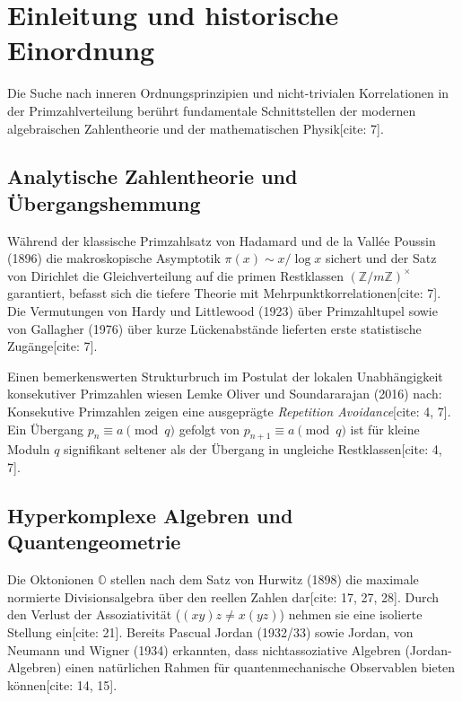 \documentclass[11pt,a4paper]{article}
\theoremstyle{definition}
\theoremstyle{remark}
\begin{document}
\section{Einleitung und historische Einordnung}

Die Suche nach inneren Ordnungsprinzipien und nicht-trivialen Korrelationen in der Primzahlverteilung berührt fundamentale Schnittstellen der modernen algebraischen Zahlentheorie und der mathematischen Physik[cite: 7].

\subsection{Analytische Zahlentheorie und Übergangshemmung}
Während der klassische Primzahlsatz von Hadamard und de la Vallée Poussin (1896) die makroskopische Asymptotik $\pi(x) \sim x / \log x$ sichert und der Satz von Dirichlet die Gleichverteilung auf die primen Restklassen $(\mathbb{Z}/m\mathbb{Z})^\times$ garantiert, befasst sich die tiefere Theorie mit Mehrpunktkorrelationen[cite: 7]. Die Vermutungen von Hardy und Littlewood (1923) über Primzahltupel sowie von Gallagher (1976) über kurze Lückenabstände lieferten erste statistische Zugänge[cite: 7]. 

Einen bemerkenswerten Strukturbruch im Postulat der lokalen Unabhängigkeit konsekutiver Primzahlen wiesen Lemke Oliver und Soundararajan (2016) nach: Konsekutive Primzahlen zeigen eine ausgeprägte \emph{Repetition Avoidance}[cite: 4, 7]. Ein Übergang $p_n \equiv a \pmod q$ gefolgt von $p_{n+1} \equiv a \pmod q$ ist für kleine Moduln $q$ signifikant seltener als der Übergang in ungleiche Restklassen[cite: 4, 7].

\subsection{Hyperkomplexe Algebren und Quantengeometrie}
Die Oktonionen $\mathbb{O}$ stellen nach dem Satz von Hurwitz (1898) die maximale normierte Divisionsalgebra über den reellen Zahlen dar[cite: 17, 27, 28]. Durch den Verlust der Assoziativität ($(xy)z \neq x(yz)$) nehmen sie eine isolierte Stellung ein[cite: 21]. Bereits Pascual Jordan (1932/33) sowie Jordan, von Neumann und Wigner (1934) erkannten, dass nichtassoziative Algebren (Jordan-Algebren) einen natürlichen Rahmen für quantenmechanische Observablen bieten können[cite: 14, 15]. 
\end{document}

